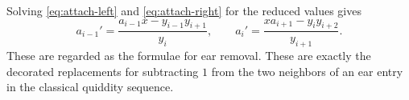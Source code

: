 \documentclass[amstex,11pt,reqno]{amsart}
\theoremstyle{definition}
\newcommand{\wt}{\operatorname{wt}}
\begin{document}



Solving \eqref{eq:attach-left} and \eqref{eq:attach-right} for the reduced values gives
\begin{equation}\label{eq:geo-reduction}
 a_{i-1}'=\frac{a_{i-1}x-y_{i-1}y_{i+1}}{y_i},
 \qquad
 a_i'=\frac{xa_{i+1}-y_i y_{i+2}}{y_{i+1}}.
\end{equation}
These are regarded as the formulae for ear removal.
These are exactly the decorated replacements for subtracting $1$ 
from the two neighbors of an ear entry in the classical quiddity sequence.
\end{document}
